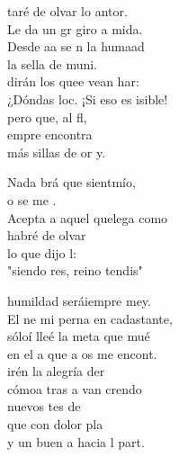 \begin{cancion}%
	taré de olvar lo antor.\\
	Le da un gr giro a mida.\\
	Desde aa se n la humaad\\
	la sella de muni.\\
	\jump
	dirán los quee vean har:\\
	¿Dóndas loc. ¡Si eso es isible!\\
	pero  que, al fl, \\
	empre encontra \\
	más sillas de or y.\jump\\
	\begin{chorus}%
		Nada brá que sientmío,\\
		o se me .\\
		Acepta a aquel quelega como  \\
		 habré de olvar   \\
		lo que dijo l:\\
		"siendo res,  reino tendis"\jump\\
	\end{chorus}%
	humildad seráiempre mey.\\
	El ne mi perna en cadastante,\\
	sóloí lleé la meta que mué\\
	en el a que a os me encont.\\
	\jump
	irén la alegría der \\
	cómoa tras a van crendo\\
	nuevos tes de   \\
	que con dolor pla\\
	y un buen a hacia l part.\\
\end{cancion}%
